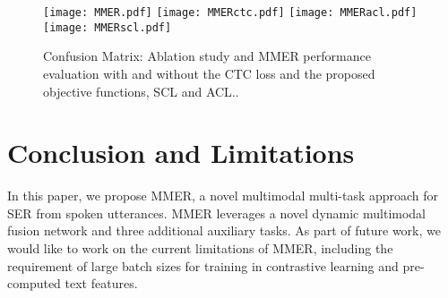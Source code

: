 \documentclass{INTERSPEECH2023}
\begin{document}
\begin{figure}[t]
\centering
\texttt{[image: MMER.pdf]}
\texttt{[image: MMERctc.pdf]}
\texttt{[image: MMERacl.pdf]}
\texttt{[image: MMERscl.pdf]}
\caption{\small Confusion Matrix: Ablation study and MMER performance evaluation with and without the CTC loss and the proposed objective functions, SCL and ACL..} 
\label{fig:cm83}
\end{figure}


\section{Conclusion and Limitations}
In this paper, we propose MMER, a novel multimodal multi-task approach for SER from spoken utterances. MMER leverages a novel dynamic multimodal fusion network and three additional auxiliary tasks. As part of future work, we would like to work on the current limitations of MMER, including the requirement of large batch sizes for training in contrastive learning and pre-computed text features.

\pagebreak


\end{document}

